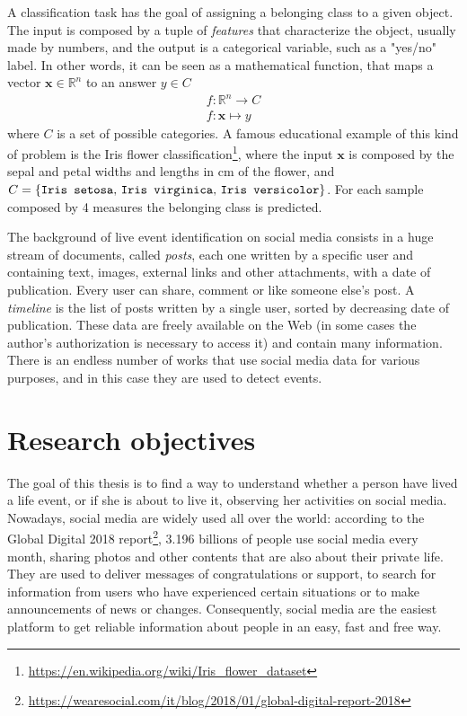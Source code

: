 A classification task has the goal of assigning a belonging class to a given object. The input is composed by a tuple of \textit{features} that characterize the object, usually made by numbers, and the output is a categorical variable, such as a "yes/no" label. In other words, it can be seen as a mathematical function, that maps a vector $ \boldsymbol{x} \in \mathbb{R}^n $ to an answer $ y \in C $
\begin{gather*}
f \colon \mathbb{R}^n \to C \\
f \colon \boldsymbol{x} \mapsto y
\end{gather*}
where $C$ is a set of possible categories. A famous educational example of this kind of problem is the Iris flower classification\footnote{\url{https://en.wikipedia.org/wiki/Iris_flower_dataset}}, where the input $ \boldsymbol{x} $ is composed by the sepal and petal widths and lengths in cm of the flower, and $C = \{\text{\texttt{Iris setosa}, \texttt{Iris virginica}, \texttt{Iris versicolor}}\}$. For each sample composed by 4 measures the belonging class is predicted.

The background of live event identification on social media consists in a huge stream of documents, called \textit{posts}, each one written by a specific user and containing text, images, external links and other attachments, with a date of publication. Every user can share, comment or like someone else's post. A \textit{timeline} is the list of posts written by a single user, sorted by decreasing date of publication. These data are freely available on the Web (in some cases the author's authorization is necessary to access it) and contain many information. There is an endless number of works that use social media data for various purposes, and in this case they are used to detect events.

\section{Research objectives}

The goal of this thesis is to find a way to understand whether a person have lived a life event, or if she is about to live it, observing her activities on social media. Nowadays, social media are widely used all over the world: according to the Global Digital 2018 report\footnote{\url{https://wearesocial.com/it/blog/2018/01/global-digital-report-2018}}, 3.196 billions of people use social media every month, sharing photos and other contents that are also about their private life. They are used to deliver messages of congratulations or support, to search for information from users who have experienced certain situations or to make announcements of news or changes. Consequently, social media are the easiest platform to get reliable information about people in an easy, fast and free way.


